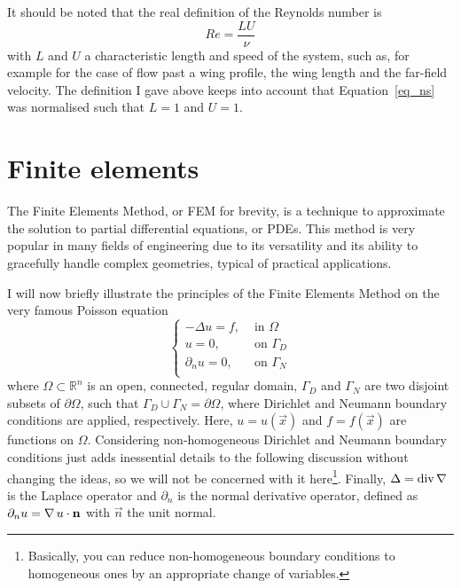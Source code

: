 It should be noted that the real definition of the Reynolds number is
\begin{equation}
  Re = \frac{LU}{\nu}
  \label{eq_reynolds}
\end{equation}
with \(L\) and \(U\) a characteristic length and speed of the system,
such as, for example for the case of flow past a wing profile, the wing length and
the far-field velocity.
The definition I gave above keeps into account that
Equation~\eqref{eq_ns} was normalised such that \(L = 1\) and \(U = 1\).


\section{Finite elements}
\label{sec_fem}
The Finite Elements Method, or FEM for brevity, is a technique to approximate the solution to partial differential equations, or PDEs.
This method is very popular in many fields of engineering due to its versatility and its ability to gracefully handle complex geometries, typical of practical applications.

I will now briefly illustrate the principles of the Finite Elements Method on the very famous Poisson equation
\begin{equation}
  \begin{cases}
   -\Delta u = f, &\text{ in } \Omega \\
   u = 0, &\text{ on } \Gamma_D \\
   \partial_{n} u = 0, &\text{ on } \Gamma_N \\
  \end{cases}
  \label{eq_poisson}
\end{equation}
where \(\Omega \subset \mathbb{R}^n\) is an open, connected, regular domain, \(\Gamma_D\) and \(\Gamma_N\) are two disjoint subsets of \(\partial \Omega\), such that \(\Gamma_D \cup \Gamma_N = \partial \Omega\), where Dirichlet and Neumann boundary conditions are applied, respectively.
Here, \(u = u(\vec{x})\) and \(f = f(\vec{x})\) are functions on
\(\Omega\).
Considering non-homogeneous Dirichlet and Neumann boundary conditions just adds
inessential details to the following discussion without changing the
ideas, so we will not be concerned with it here\footnote{Basically, you
can reduce non-homogeneous boundary conditions to homogeneous ones by an
appropriate change of variables.}.
Finally, \(\Delta = \operatorname{div} \operatorname{\nabla}\) is the Laplace operator and \(\partial_{n}\) is the normal derivative operator, defined as \(\partial_{n} u = \operatorname{\nabla} u \cdot \mathbf{n}\) with \(\vec{n}\) the unit normal.

